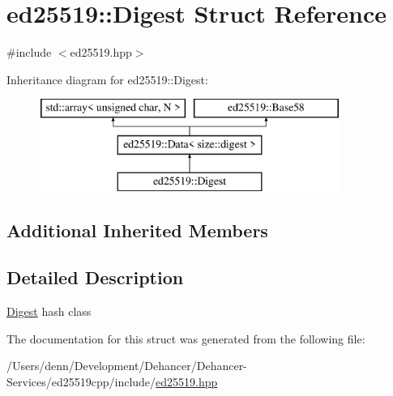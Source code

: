 \hypertarget{structed25519_1_1_digest}{}\section{ed25519\+:\+:Digest Struct Reference}
\label{structed25519_1_1_digest}


{\ttfamily \#include $<$ed25519.\+hpp$>$}

Inheritance diagram for ed25519\+:\+:Digest\+:\begin{figure}[H]
\begin{center}
\leavevmode
\includegraphics[height=3.000000cm]{structed25519_1_1_digest}
\end{center}
\end{figure}
\subsection*{Additional Inherited Members}


\subsection{Detailed Description}
\mbox{\hyperlink{structed25519_1_1_digest}{Digest}} hash class 

The documentation for this struct was generated from the following file\+:\begin{DoxyCompactItemize}
\item 
/\+Users/denn/\+Development/\+Dehancer/\+Dehancer-\/\+Services/ed25519cpp/include/\mbox{\hyperlink{ed25519_8hpp}{ed25519.\+hpp}}\end{DoxyCompactItemize}

